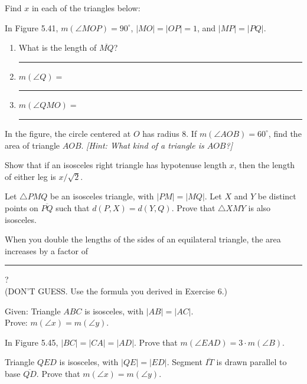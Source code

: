\documentclass[12pt]{book} %
\begin{document}
\begin{ExerciseList}

\Exercise Find $x$ in each of the triangles below:


\Exercise In Figure 5.41, $m(\angle MOP)=90^\circ$, $|MO|=|OP|=1$, and $|MP|=|PQ|$.


\begin{enumerate}
\item[(a)] What is the length of $\overline{MQ}$? \rule{2.5cm}{0.4pt}
\item[(b)] $m(\angle Q)=$ \rule{2.5cm}{0.4pt}
\item[(c)] $m(\angle QMO)=$ \rule{2.5cm}{0.4pt}
\end{enumerate}

\Exercise In the figure, the circle centered at $O$ has radius 8. If $m(\angle AOB)=60^\circ$, find the area of triangle $AOB$. \textit{[Hint: What kind of a triangle is $AOB$?]}


\Exercise Show that if an isosceles right triangle has hypotenuse length $x$, then the length of either leg is $x/\sqrt{2}$.

\Exercise Let $\triangle PMQ$ be an isosceles triangle, with $|PM|=|MQ|$. Let $X$ and $Y$ be distinct points on $\overline{PQ}$ such that $d(P,X)=d(Y,Q)$. Prove that $\triangle XMY$ is also isosceles.


\Exercise When you double the lengths of the sides of an equilateral triangle, the area increases by a factor of \rule{2cm}{0.4pt}?\\
(DON'T GUESS. Use the formula you derived in Exercise 6.)

\Exercise Given: Triangle $ABC$ is isosceles, with $|AB|=|AC|$.\\
Prove: $m(\angle x)=m(\angle y)$.


\Exercise In Figure 5.45, $|BC|=|CA|=|AD|$. Prove that $m(\angle EAD)=3\cdot m(\angle B)$.


\Exercise Triangle $QED$ is isosceles, with $|QE|=|ED|$. Segment $\overline{IT}$ is drawn parallel to base $\overline{QD}$. Prove that $m(\angle x)=m(\angle y)$.



\end{ExerciseList}
\end{document}
